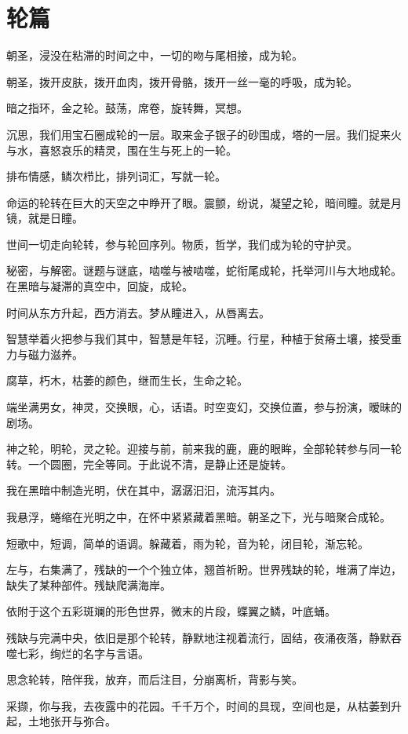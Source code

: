 \documentclass[UTF8]{article}
\begin{document}
\section{轮篇}
\par 朝圣，浸没在粘滞的时间之中，一切的吻与尾相接，成为轮。
\par 朝圣，拨开皮肤，拨开血肉，拨开骨骼，拨开一丝一毫的呼吸，成为轮。
\par 暗之指环，金之轮。鼓荡，席卷，旋转舞，冥想。
\par 沉思，我们用宝石圈成轮的一层。取来金子银子的砂围成，塔的一层。我们捉来火与水，喜怒哀乐的精灵，围在生与死上的一轮。
\par 排布情感，鳞次栉比，排列词汇，写就一轮。
\par 命运的轮转在巨大的天空之中睁开了眼。震颤，纷说，凝望之轮，暗间瞳。就是月镜，就是日瞳。
\par 世间一切走向轮转，参与轮回序列。物质，哲学，我们成为轮的守护灵。
\par 秘密，与解密。谜题与谜底，啮噬与被啮噬，蛇衔尾成轮，托举河川与大地成轮。在黑暗与凝滞的真空中，回旋，成轮。
\par 时间从东方升起，西方消去。梦从瞳进入，从唇离去。
\par 智慧举着火把参与我们其中，智慧是年轻，沉睡。行星，种植于贫瘠土壤，接受重力与磁力滋养。
\par 腐草，朽木，枯萎的颜色，继而生长，生命之轮。
\par 端坐满男女，神灵，交换眼，心，话语。时空变幻，交换位置，参与扮演，暧昧的剧场。
\par 神之轮，明轮，灵之轮。迎接与前，前来我的鹿，鹿的眼眸，全部轮转参与同一轮转。一个圆圈，完全等同。于此说不清，是静止还是旋转。
\par 我在黑暗中制造光明，伏在其中，潺潺汩汩，流泻其内。
\\[0.6cm]
\par 我悬浮，蜷缩在光明之中，在怀中紧紧藏着黑暗。朝圣之下，光与暗聚合成轮。
\par 短歌中，短调，简单的语调。躲藏着，雨为轮，音为轮，闭目轮，渐忘轮。
\par 左与，右集满了，残缺的一个个独立体，翘首祈盼。世界残缺的轮，堆满了岸边，缺失了某种部件。残缺爬满海岸。
\par 依附于这个五彩斑斓的形色世界，微末的片段，蝶翼之鳞，叶底蛹。
\par 残缺与完满中央，依旧是那个轮转，静默地注视着流行，固结，夜涌夜落，静默吞噬七彩，绚烂的名字与言语。
\par 思念轮转，陪伴我，放弃，而后注目，分崩离析，背影与笑。
\par 采撷，你与我，去夜露中的花园。千千万个，时间的具现，空间也是，从枯萎到升起，土地张开与弥合。
\end{document}
